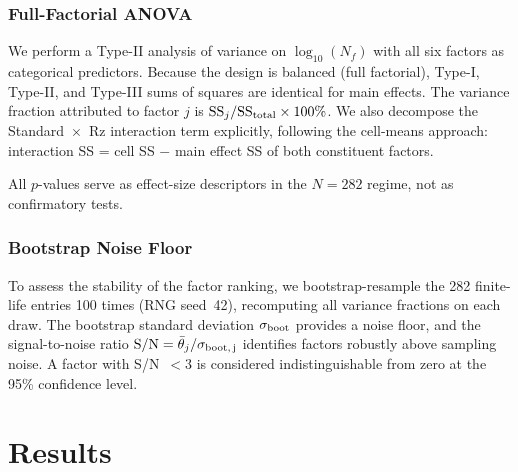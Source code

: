 \documentclass[12pt,a4paper]{article}
\begin{document}
\subsubsection{Full-Factorial ANOVA}

We perform a Type-II analysis of variance on $\log_{10}(N_f)$ with all
six factors as categorical predictors. Because the design is balanced
(full factorial), Type-I, Type-II, and Type-III sums of squares are
identical for main effects. The variance fraction attributed to factor
$j$ is $\mathrm{SS}_j / \mathrm{SS}_{\rm total} \times 100\%$. We also
decompose the Standard~$\times$~Rz interaction term explicitly, following
the cell-means approach: interaction SS = cell SS $-$ main effect SS of
both constituent factors.

All $p$-values serve as effect-size descriptors in the $N=282$ regime,
not as confirmatory tests.

\subsubsection{Bootstrap Noise Floor}

To assess the stability of the factor ranking, we bootstrap-resample the
282 finite-life entries 100 times (RNG seed~42), recomputing all variance
fractions on each draw. The bootstrap standard deviation $\sigma_{\rm boot}$
provides a noise floor, and the signal-to-noise ratio
$\mathrm{S/N} = \bar{\theta}_j / \sigma_{\rm boot,\,j}$ identifies
factors robustly above sampling noise. A factor with S/N~$<3$ is
considered indistinguishable from zero at the 95\% confidence level.

\section{Results}
\label{sec:results}
\end{document}
